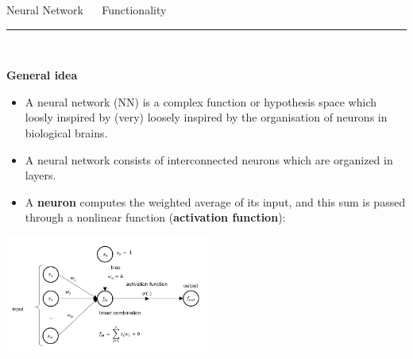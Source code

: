 \documentclass[11pt,compress,t,notes=noshow, xcolor=table]{beamer}
\begin{document}
\LARGE
\begin{frame}{\textcolor{gray!80}{Neural Network} ~~ Functionality}
\normalsize
\vspace{-0.5cm}
\noindent \textcolor{gray!80}{\rule{\textwidth}{1pt}}

\vspace{0.3cm}

\footnotesize

\colorbox{gray!80}{\textcolor{white}{UNSUPERVISED / SEMI-SUPERVISED?}}
\colorbox{gray!80}{\textcolor{white}{PARAMETRIC}}
\colorbox{gray!80}{\textcolor{white}{WHITE-BOX}}

\medskip

\textbf{\textcolor{gray!80}{General idea}} ~~
\begin{itemize}

\item A neural network (NN) is a complex function or hypothesis space which loosly inspired by (very) loosely inspired by the organisation of
neurons in biological brains.

\item A neural network consists of interconnected neurons which are organized in layers.

\item A \textbf{neuron} computes the weighted average of its input, and this sum is passed through a nonlinear function (\textbf{activation function}):
\end{itemize}

\medskip
  \centering
  \includegraphics[width=0.5\textwidth]{figure/nn_neuron.PNG}

\end{frame}

\end{document}
